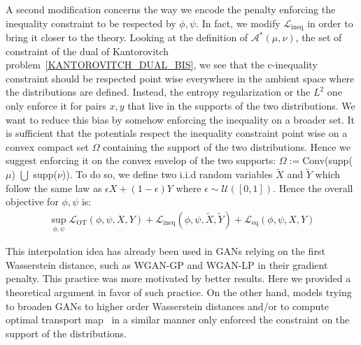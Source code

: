 \documentclass[runningheads]{llncs}
\begin{document}
A second modification concerns the way we encode the penalty enforcing the inequality constraint to be respected by $\phi,\psi$. In fact, we modify $\mathcal{L}_{\text{ineq}}$ in order to bring it closer to the theory. Looking at the definition of $\mathcal{A}^*(\mu,\nu)$, the set of constraint of the dual of Kantorovitch problem~\eqref{KANTOROVITCH_DUAL_BIS}, we see that the c-inequality constraint should be respected point wise everywhere in the ambient space where the distributions are defined. Instead, the entropy regularization or the $L^2$ one only enforce it for pairs $x,y$ that live in the supports of the two distributions. We want to reduce this bias by somehow enforcing the inequality on a broader set. It is sufficient that the potentials respect the inequality constraint point wise on a convex compact set $\Omega$ containing the support of the two distributions. Hence we suggest enforcing it on the convex envelop of the two supports: $\Omega:=$Conv(supp($\mu$) $\bigcup$ supp($\nu$)). To do so, we define two i.i.d random variables $\tilde{X}$ and $\tilde{Y}$ which follow the same law as $\epsilon X + (1- \epsilon)Y$ where $\epsilon \sim \mathcal{U}([0,1])$. Hence the overall objective for $\phi,\psi$ is:
\begin{align}
    \sup_{\phi,\psi} \mathcal{L}_{\text{OT}}(\phi,\psi,X,Y) + \mathcal{L}_{\text{ineq}}(\phi,\psi,\tilde{X},\tilde{Y}) +
 \mathcal{L}_{\text{eq}}(\phi,\psi,X,Y)
\label{DISCRIMINATOR_LOSS_EQ_INEQ_INTERP}
\end{align}

\begin{remark}
\normalfont This interpolation idea has already been used in GANs relying on the first Wasserstein distance, such as WGAN-GP and WGAN-LP in their gradient penalty. This practice was more motivated by better results. Here we provided a theoretical argument in favor of such practice. On the other hand, models trying to broaden GANs to higher order Wasserstein distances and/or to compute optimal transport map~\citep{Sanjabi2018swgan,Seguy2018LSOT,Salimans2017otgan} in a similar manner only enforced the constraint on the support of the distributions.
\end{remark}
\end{document}
